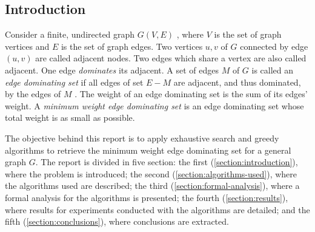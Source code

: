 \begin{center}
\section{Introduction}\label{section:introduction}
\end{center}
Consider a finite, undirected graph $G(V,E)$ , where $V$ is the set of graph vertices and $E$ is the set of graph edges.
Two vertices $u, v$ of $G$ connected by edge $(u,v)$ are called adjacent nodes.
Two edges which share a vertex are also called adjacent.
One edge \emph{dominates} its adjacent.
A set of edges $M$ of $G$ is called an \emph{edge dominating set} if all edges of set $E - M$ are adjacent, and thus dominated, by the edges of $M$ \cite{dominating}.
The weight of an edge dominating set is the sum of its edges' weight. 
A \emph{minimum weight edge dominating set} is an edge dominating set whose total weight is as small as possible.

The objective behind this report is to apply exhaustive search and greedy algorithms to retrieve the minimum weight edge dominating set for a general graph $G$.
The report is divided in five section: the first (\autoref{section:introduction}), where the problem is introduced;
the second (\autoref{section:algorithms-used}), where the algorithms used are described;
the third (\autoref{section:formal-analysis}), where a formal analysis for the algorithms is presented;
the fourth (\autoref{section:results}), where results for experiments conducted with the algorithms are detailed;
and the fifth (\autoref{section:conclusions}), where conclusions are extracted.